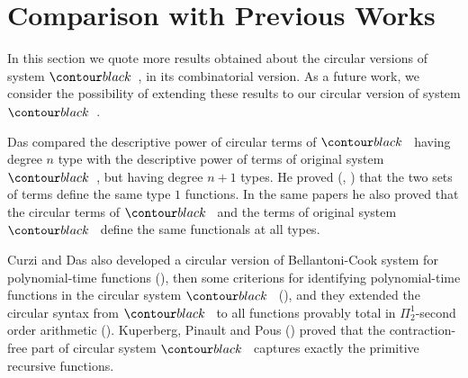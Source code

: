 \section{Comparison with Previous Works}
\label{section-comparison}

In this section we quote more results obtained about the circular versions of system $\systemT$,
in its combinatorial version. As a future work, we consider the possibility of extending these results
to our circular version of system $\systemT$.

Das compared the descriptive power of circular terms of $\systemT$ 
having degree $n$ type with the descriptive power of terms of original system $\systemT$,
but having degree $n+1$ types. 
He  proved (\cite{2021-Anupam-Das}, \cite{DBLP:conf/fscd/000221})
that the two sets of terms define the same type $1$ functions. In the same papers he also proved 
that the circular terms of $\systemT$ and the terms of original system $\systemT$ 
define the same functionals at all types.

Curzi and Das  also developed a circular version of Bellantoni-Cook system for 
polynomial-time functions (\cite{DBLP:conf/lics/Curzi022}), 
then some criterions for identifying polynomial-time functions
in the circular system $\systemT$ (\cite{DBLP:conf/csl/Curzi023}),
and they extended the circular syntax from $\systemT$ to all functions provably total in 
$\Pi^1_2$-second order arithmetic (\cite{DBLP:conf/lics/Curzi023}).
Kuperberg, Pinault and Pous (\cite{2021-Kuperberg-Pinault-Pous})
proved that the contraction-free part of circular system $\systemT$
captures exactly the primitive recursive functions.
